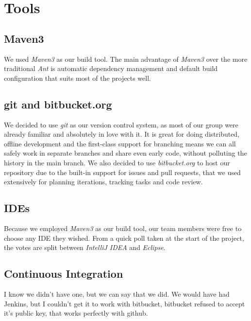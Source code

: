 \section{Tools}

\subsection{Maven3}

We used \textit{Maven3} as our build tool. The main advantage of \textit{Maven3} over the more traditional \textit{Ant} is automatic dependency management and default build configuration that suits most of the projects well.

\subsection{git and bitbucket.org}
We decided to use \textit{git} as our version control system, as most of our group were already familiar and absolutely in love with it.  It is great for doing distributed, offline development and the first-class support for branching means we can all safely work in separate branches and share even early code, without polluting the history in the main branch. We also decided to use \textit{bitbucket.org} to host our repository due to the built-in support for issues and pull requests, that we used extensively for planning iterations, tracking tasks and code review.

\subsection{IDEs}
Because we employed \textit{Maven3} as our build tool, our team members were free to choose any IDE they wished. From a quick poll taken at the start of the project, the votes are split between \textit{IntelliJ IDEA} and \textit{Eclipse}. 

\subsection{Continuous Integration}
I know we didn't have one, but we can say that we did. We would have had Jenkins, but I couldn't get it to work with bitbucket, bitbucket refused to accept it's public key, that works perfectly with github.

